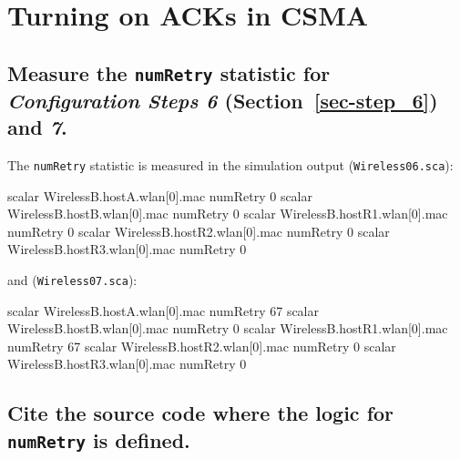 \documentclass[
  letterpaper,
  DIV=11,
  numbers=noendperiod]{scrartcl}
\newenvironment{Shaded}{\begin{snugshade}}{\end{snugshade}}
\newcommand{\NormalTok}[1]{\textcolor[rgb]{0.00,0.23,0.31}{#1}}
\begin{document}
\section{Turning on ACKs in CSMA}\label{sec-step_7}

\subsection{\texorpdfstring{Measure the \texttt{numRetry} statistic for
\emph{Configuration Steps 6} (Section~\ref{sec-step_6}) and
\emph{7}.}{Measure the numRetry statistic for Configuration Steps 6 (Section~) and 7.}}\label{measure-the-numretry-statistic-for-configuration-steps-6-sec-step_6-and-7.}

The \texttt{numRetry} statistic is measured in the simulation output
(\texttt{Wireless06.sca}):

\begin{Shaded}
\begin{Highlighting}[]
\NormalTok{scalar WirelessB.hostA.wlan[0].mac}
\NormalTok{  numRetry 0}
\NormalTok{scalar WirelessB.hostB.wlan[0].mac}
\NormalTok{  numRetry 0}
\NormalTok{scalar WirelessB.hostR1.wlan[0].mac}
\NormalTok{  numRetry 0}
\NormalTok{scalar WirelessB.hostR2.wlan[0].mac}
\NormalTok{  numRetry 0}
\NormalTok{scalar WirelessB.hostR3.wlan[0].mac}
\NormalTok{  numRetry 0}
\end{Highlighting}
\end{Shaded}

and (\texttt{Wireless07.sca}):

\begin{Shaded}
\begin{Highlighting}[]
\NormalTok{scalar WirelessB.hostA.wlan[0].mac}
\NormalTok{  numRetry 67}
\NormalTok{scalar WirelessB.hostB.wlan[0].mac}
\NormalTok{  numRetry 0}
\NormalTok{scalar WirelessB.hostR1.wlan[0].mac}
\NormalTok{  numRetry 67}
\NormalTok{scalar WirelessB.hostR2.wlan[0].mac}
\NormalTok{  numRetry 0}
\NormalTok{scalar WirelessB.hostR3.wlan[0].mac}
\NormalTok{  numRetry 0}
\end{Highlighting}
\end{Shaded}

\subsection{\texorpdfstring{Cite the source code where the logic for
\texttt{numRetry} is
defined.}{Cite the source code where the logic for numRetry is defined.}}\label{cite-the-source-code-where-the-logic-for-numretry-is-defined.}
\end{document}
